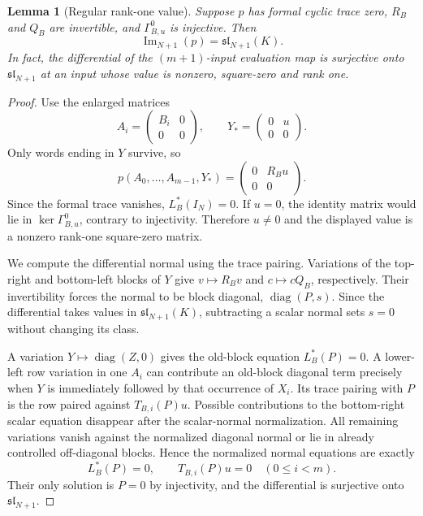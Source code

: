 \documentclass[11pt,reqno]{amsart}
\newtheorem{lemma}[theorem]{Lemma}
\theoremstyle{definition}
\newcommand{\im}{\operatorname{Im}}
\begin{document}
\begin{lemma}[Regular rank-one value]\label{lem:border}
Suppose $p$ has formal cyclic trace zero, $R_B$ and $Q_B$ are invertible, and $\Gamma^0_{B,u}$ is injective.  Then
\[
 \im_{N+1}(p)=\mathfrak{sl}_{N+1}(K).
\]
In fact, the differential of the $(m+1)$-input evaluation map is surjective onto $\mathfrak{sl}_{N+1}$ at an input whose value is nonzero, square-zero and rank one.
\end{lemma}
\begin{proof}
Use the enlarged matrices
\[
 A_i=\begin{pmatrix}B_i&0\\0&0\end{pmatrix},
 \qquad Y_*=\begin{pmatrix}0&u\\0&0\end{pmatrix}.
\]
Only words ending in $Y$ survive, so
\[
 p(A_0,\ldots,A_{m-1},Y_*)=
 \begin{pmatrix}0&R_Bu\\0&0\end{pmatrix}.
\]
Since the formal trace vanishes, $L_B^*(I_N)=0$.  If $u=0$, the identity matrix would lie in $\ker\Gamma^0_{B,u}$, contrary to injectivity.  Therefore $u\ne0$ and the displayed value is a nonzero rank-one square-zero matrix.

We compute the differential normal using the trace pairing.  Variations of the top-right and bottom-left blocks of $Y$ give $v\mapsto R_Bv$ and $c\mapsto cQ_B$, respectively.  Their invertibility forces the normal to be block diagonal, $\operatorname{diag}(P,s)$.  Since the differential takes values in $\mathfrak{sl}_{N+1}(K)$, subtracting a scalar normal sets $s=0$ without changing its class.

A variation $Y\mapsto\operatorname{diag}(Z,0)$ gives the old-block equation $L_B^*(P)=0$.  A lower-left row variation in one $A_i$ can contribute an old-block diagonal term precisely when $Y$ is immediately followed by that occurrence of $X_i$.  Its trace pairing with $P$ is the row paired against $T_{B,i}(P)u$.  Possible contributions to the bottom-right scalar equation disappear after the scalar-normal normalization.  All remaining variations vanish against the normalized diagonal normal or lie in already controlled off-diagonal blocks.  Hence the normalized normal equations are exactly
\[
 L_B^*(P)=0,\qquad T_{B,i}(P)u=0\quad(0\le i<m).
\]
Their only solution is $P=0$ by injectivity, and the differential is surjective onto $\mathfrak{sl}_{N+1}$.


\end{proof}
\end{document}
